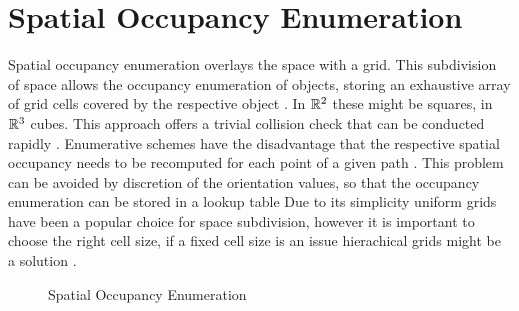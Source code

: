 \section{Spatial Occupancy Enumeration} \label{sec:spatialOccupancyEnumeration}
Spatial occupancy enumeration overlays the space with a grid. This subdivision of space allows the occupancy enumeration of objects, storing an exhaustive array of grid cells covered by the respective object \cite{Ericson.2005,Hayward.1986}. In $\mathbb{R}^2$ these might be squares, in $\mathbb{R}^3$ cubes. This approach offers a trivial collision check that can be conducted rapidly \cite{Ericson.2005,Hayward.1986}. Enumerative schemes have the disadvantage that the respective spatial occupancy needs to be recomputed for each point of a given path \cite{Hayward.1986}. This problem can be avoided by discretion of the orientation values, so that the occupancy enumeration can be stored in a lookup table \cite{Ziegler.2008} Due to its simplicity uniform grids have been a popular choice for space subdivision, however it is important to choose the right cell size, if a fixed cell size is an issue hierachical grids might be a solution \cite{Ericson.2005}.

\begin{figure}[h]
    \caption{Spatial Occupancy Enumeration}
    \label{fig:spatialOccupancyEnumeration}
\end{figure}